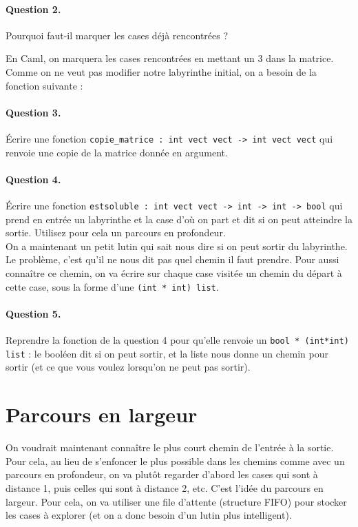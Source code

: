 \documentclass[10pt,a4paper]{article}
\begin{document}
\paragraph{Question 2.} Pourquoi faut-il marquer les cases déjà rencontrées ?

En Caml, on marquera les cases rencontrées en mettant un 3 dans la matrice.
Comme on ne veut pas modifier notre labyrinthe initial, on a besoin de la
fonction suivante :
\paragraph{Question 3.} Écrire une fonction \texttt{copie\_matrice : int vect vect -> int vect vect} qui renvoie
une copie de la matrice donnée en argument.

\paragraph{Question 4.} Écrire une fonction
\texttt{estsoluble : int vect vect -> int -> int -> bool} qui prend en entrée un
labyrinthe et la case d'où on part et dit si on peut atteindre la sortie. 
Utilisez pour cela un parcours en profondeur.
\\

On a maintenant un petit lutin qui sait nous dire si on peut sortir du
labyrinthe. Le problème, c'est qu'il ne nous dit pas quel chemin il faut
prendre. Pour aussi connaître ce chemin, on va écrire sur chaque case visitée
un chemin du départ à cette case, sous la forme d'une \texttt{(int * int) list}.

\paragraph{Question 5.} Reprendre la fonction de la question 4 pour qu'elle
renvoie un \texttt{bool * (int*int) list} : le booléen dit si on peut sortir,
et la liste nous donne un chemin pour sortir (et ce que vous voulez lorsqu'on ne
peut pas sortir).

\section{Parcours en largeur}
On voudrait maintenant connaître le plus court chemin de l'entrée à la sortie.
Pour cela, au lieu de s'enfoncer le plus possible dans les chemins comme avec
un parcours en profondeur, on va plutôt regarder d'abord les cases qui sont
à distance 1, puis celles qui sont à distance 2, etc. C'est l'idée du parcours
en largeur. Pour cela, on va utiliser une file d'attente (structure FIFO) pour
stocker les cases à explorer (et on a donc besoin d'un lutin plus intelligent).
\end{document}
